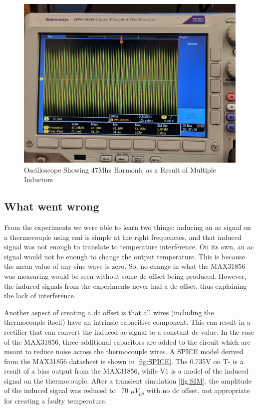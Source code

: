 \begin{figure}
    \centering
    \includegraphics[width=\linewidth]{pictures/Harmonic.jpg}
    \caption{Oscilloscope Showing 47Mhz Harmonic as a Result of Multiple Inductors}
    \label{fig:OsciHarmonic}
\end{figure}

\subsection{What went wrong}\label{wwdw}
From the experiments we were able to learn two things: inducing an \ac{ac} signal on a thermocouple using \ac{emi} is simple at the right frequencies, and that induced signal was not enough to translate to temperature interference. 
On its own, an \ac{ac} signal would not be enough to change the output temperature. This is because the mean value of any sine wave is zero. So, no change in what the MAX31856 was measuring would be seen without some \ac{dc} offset being produced. However, the induced signals from the experiments never had a \ac{dc} offset, thus explaining the lack of interference. 

Another aspect of creating a \ac{dc} offset is that all wires (including the thermocouple itself) have an intrinsic capacitive component. This can result in a rectifier that can convert the induced \ac{ac} signal to a constant \ac{dc} value. In the case of the MAX31856, three additional capacitors are added to the circuit which are meant to reduce noise across the thermocouple wires. A SPICE model derived from the MAX31856 datasheet is shown in \cref{fig:SPICE}. The 0.735V on T- is a result of a bias output from the MAX31856, while V1 is a model of the induced signal on the thermocouple. After a transient simulation \cref{fig:SIM}, the amplitude of the induced signal was reduced to ~70 $\mu V_{pp}$ with no \ac{dc} offset, not appropriate for creating a faulty temperature.  

